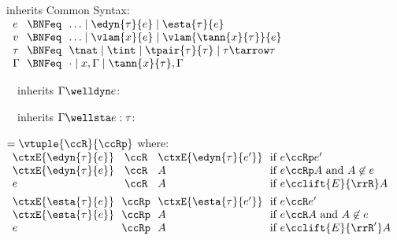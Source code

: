\begin{flushleft}

 inherits Common Syntax:\\
$\begin{array}{l@{~~}c@{~~}l}
  e & \BNFeq & \ldots \mid \edyn{\tau}{e} \mid \esta{\tau}{e}
\\
  v & \BNFeq & \ldots \mid \vlam{x}{e} \mid \vlam{\tann{x}{\tau}}{e}
\\
  \tau & \BNFeq & \tnat \mid \tint \mid \tpair{\tau}{\tau} \mid \tau \tarrow \tau
\\
  \Gamma & \BNFeq & \cdot \mid x,\Gamma \mid \tann{x}{\tau},\Gamma
\end{array}$

\smallskip
\begin{minipage}[t]{0.5\columnwidth}
~~inherits $\Gamma \welldyn e$:\\
\begin{mathpar}
\end{mathpar}
\end{minipage}%
\begin{minipage}[t]{0.5\columnwidth}
~~inherits $\Gamma \wellsta e : \tau$:\\
\begin{mathpar}

\end{mathpar}
\end{minipage}

\smallskip
{} $= \vtuple{\ccR}{\ccRp}$ where:\\
$\begin{array}{l@{~~}c@{~~}l@{~~}l}
\ctxE{\edyn{\tau}{e}} & \ccR & \ctxE{\edyn{\tau}{e'}}
  & \mbox{if $e \ccRp e'$}
\\
\ctxE{\edyn{\tau}{e}} & \ccR & A
  & \mbox{if $e \ccRp A$ and $A \not\in e$}
\\
e & \ccR & A
  & \mbox{if $e \cclift{E}{\rrR} A$}
\\[1ex]
\ctxE{\esta{\tau}{e}} & \ccRp & \ctxE{\esta{\tau}{e'}}
 & \mbox{if $e \ccR e'$}
\\
\ctxE{\esta{\tau}{e}} & \ccRp & A
 & \mbox{if $e \ccR A$ and $A \not\in e$}
\\
e & \ccRp & A
 & \mbox{if $e \cclift{E}{\rrR'} A$}
\end{array}$

\end{flushleft}
